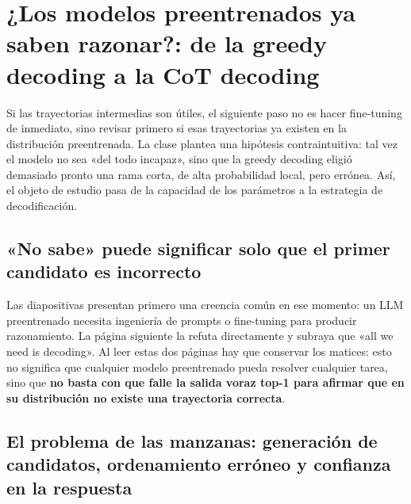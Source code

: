 \section{¿Los modelos preentrenados ya saben razonar?: de la greedy decoding a la CoT decoding}

Si las trayectorias intermedias son útiles, el siguiente paso no es hacer fine-tuning de inmediato, sino revisar primero si esas trayectorias ya existen en la distribución preentrenada. La clase plantea una hipótesis contraintuitiva: tal vez el modelo no sea «del todo incapaz», sino que la greedy decoding eligió demasiado pronto una rama corta, de alta probabilidad local, pero errónea. Así, el objeto de estudio pasa de la capacidad de los parámetros a la estrategia de decodificación.

\subsection{«No sabe» puede significar solo que el primer candidato es incorrecto}

Las diapositivas presentan primero una creencia común en ese momento: un LLM preentrenado necesita ingeniería de prompts o fine-tuning para producir razonamiento. La página siguiente la refuta directamente y subraya que «all we need is decoding». Al leer estas dos páginas hay que conservar los matices: esto no significa que cualquier modelo preentrenado pueda resolver cualquier tarea, sino que \textbf{no basta con que falle la salida voraz top-1 para afirmar que en su distribución no existe una trayectoria correcta}.




\subsection{El problema de las manzanas: generación de candidatos, ordenamiento erróneo y confianza en la respuesta}

